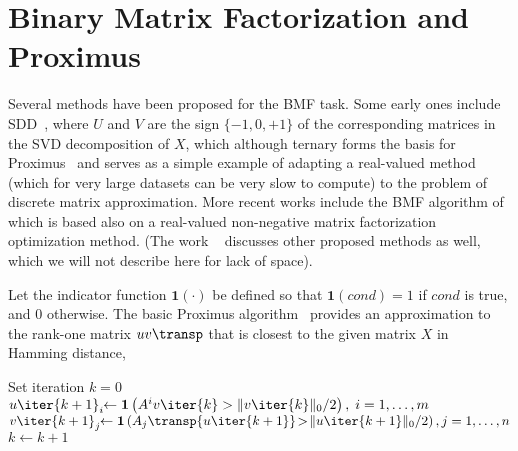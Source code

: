 \documentclass[a4paper]{IEEEtran}
\begin{document}
\section{Binary Matrix Factorization and Proximus}

Several methods have been proposed for the BMF task. Some early ones include SDD~\cite{sdd}, where $U$ and $V$ are the sign $\{-1,0,+1\}$ of the corresponding matrices in the SVD decomposition of $X$, which although ternary forms the basis for Proximus~\cite{proximus} and serves as a simple example of adapting a real-valued method (which for very large datasets can be very slow to compute) to the problem of discrete matrix approximation.
More recent works include the BMF algorithm of~\cite{zhang07} which is based also on a real-valued non-negative matrix factorization optimization method.
(The work ~\cite{zhang07} discusses other proposed methods as well, which we will not describe here for lack of space). %

\def\indicator{\mathbf{1}}
Let the indicator function $\indicator(\cdot)$ be defined so that $\indicator(cond)=1$ if $cond$ is true, and $0$ otherwise. The basic Proximus algorithm~\cite{proximus} provides an approximation to the rank-one matrix $uv\transp$ that is closest to the given matrix $X$ in Hamming distance,
\def\bool{\mathrm{bool}}
\begin{algorithm}
Set iteration $k=0$\;
 {
  $u\iter{k+1}_i\!\! \leftarrow \indicator \left( A^i v\iter{k} > \|v\iter{k}\|_0/2 \right),\;i=1,\ldots,m$ \;
  $v\iter{k+1}_j\!\! \leftarrow \indicator\left(A_j\transp{u\iter{k+1}}\!>\!\|u\iter{k+1}\|_0/2 \right),j=1,\ldots,n$ \;
  $k \leftarrow k+1 $ \;
}
\label{alg:proximus}
\end{algorithm}
\end{document}
